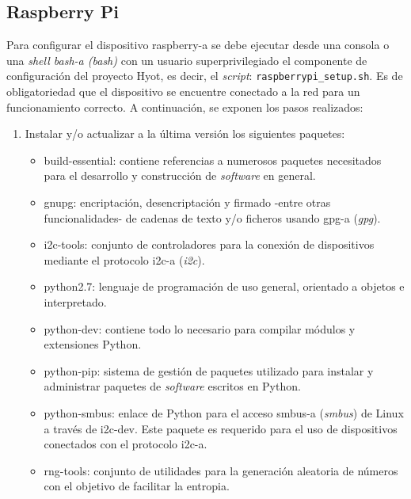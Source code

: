 \documentclass[12pt,a4paper, twoside]{report}
\begin{document}
	\subsection{Raspberry Pi}
	
	Para configurar el dispositivo \gls{raspberry-a} se debe ejecutar desde una consola o una \textit{\gls{shell} \gls{bash-a} (\textit{\gls{bash}})} con un usuario superprivilegiado el componente de configuración del proyecto Hyot, es decir, el \textit{\gls{script}}: \texttt{raspberrypi\_setup.sh}.  Es de obligatoriedad que el dispositivo se encuentre conectado a la red para un funcionamiento correcto. A continuación, se exponen los pasos realizados: 
	
	\begin{enumerate}
		\item Instalar y/o actualizar a la última versión los siguientes paquetes:
	
		\begin{itemize}
			\item build-essential: contiene referencias a numerosos paquetes necesitados para el desarrollo y construcción de \textit{software} en general.
			\item gnupg: encriptación, desencriptación y firmado -entre otras funcionalidades- de cadenas de texto y/o ficheros usando \gls{gpg-a} (\textit{\gls{gpg}}).
			\item i2c-tools: conjunto de controladores para la conexión de dispositivos mediante el protocolo \gls{i2c-a} (\textit{\gls{i2c}}).
			\item python2.7: lenguaje de programación de uso general, orientado a objetos e interpretado.
			\item python-dev: contiene todo lo necesario para compilar módulos y extensiones Python.
			\item python-pip: sistema de gestión de paquetes utilizado para instalar y administrar paquetes de \textit{software} escritos en Python.
			\item python-smbus: enlace de Python para el acceso \gls{smbus-a} (\textit{\gls{smbus}}) de Linux a través de i2c-dev. Este paquete es requerido para el uso de dispositivos conectados con el protocolo \gls{i2c-a}.
			\item rng-tools: conjunto de utilidades para la generación aleatoria de números con el objetivo de facilitar la \gls{entropia}.
		\end{itemize}
		
		\begin{longtable}{|m{4cm}|m{4cm}|}
			\hline
			

\end{longtable}
\end{enumerate}
\end{document}
